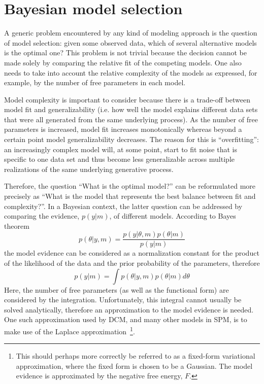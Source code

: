 \section{Bayesian model selection \label{mc}}

A generic problem encountered by any kind of modeling approach is the question of model selection:  given some observed data, which of several alternative models is the optimal one?  This problem is not trivial because the decision cannot be made solely by comparing the relative fit of the competing models.  One also needs to take into account the relative complexity of the models as expressed, for example, by the number of free parameters in each model.

Model complexity is important to consider because there is a trade-off between model fit and generalizability (i.e. how well the model explains different data sets that were all generated from the same underlying process).  As the number of free parameters is increased, model fit increases monotonically whereas beyond a certain point model generalizability decreases.  The reason for this is ``overfitting'':  an increasingly complex model will, at some point, start to fit noise that is specific to one data set and thus become less generalizable across multiple realizations of the same underlying generative process.

    Therefore, the question ``What is the optimal model?'' can be reformulated more precisely as ``What is the model that represents the best balance between fit and complexity?''. In a Bayesian context, the latter question can be addressed by comparing the evidence, $p(y|m)$, of different models. According to Bayes theorem
\begin{equation}
p(\theta|y,m) = \frac{p(y|\theta,m)p(\theta|m)}{p(y|m)}
\end{equation}
the model evidence can be considered as a normalization constant for the product of the likelihood of the data and the prior probability of the parameters, therefore
\begin{equation}
p(y|m) = \int p(\theta|y,m) p(\theta|m) d\theta
\end{equation}
Here, the number of free parameters (as well as the functional form) are considered by the integration.  Unfortunately, this integral cannot usually be solved analytically, therefore an approximation to the model evidence is needed. One such approximation used by DCM, and many other models in SPM, is to make use of the Laplace approximation~\footnote{This should perhaps more correctly be referred to as a fixed-form variational approximation, where the fixed form is chosen to be a Gaussian. The model evidence is approximated by the negative free energy, $F$.}.

